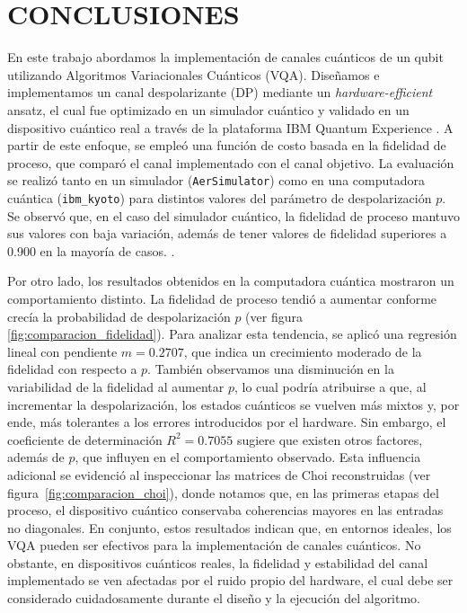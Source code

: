 \documentclass[letterpaper,12pt]{thesisECFM}
\theoremstyle{plain}
\theoremstyle{definition}
\theoremstyle{definition}
\theoremstyle{remark}
\newcommand{\1}{\mathbb{1}}
\begin{document}
\chapter{CONCLUSIONES} %
En este trabajo abordamos la implementación de canales cuánticos de un qubit utilizando Algoritmos Variacionales Cuánticos (VQA). Diseñamos e implementamos un canal despolarizante (DP) mediante un \textit{hardware-efficient} ansatz, el cual fue optimizado en un simulador cuántico y validado en un dispositivo cuántico real a través de la plataforma IBM Quantum Experience \cite{VQA,ibm_quantum_resources}. A partir de este enfoque, se empleó una función de costo basada en la fidelidad de proceso, que comparó el canal implementado con el canal objetivo. La evaluación se realizó tanto en un simulador (\texttt{AerSimulator}) como en una computadora cuántica (\texttt{ibm\_kyoto}) para distintos valores del parámetro de despolarización $p$. Se observó que, en el caso del simulador cuántico, la fidelidad de proceso mantuvo sus valores con baja variación, además de tener valores de fidelidad superiores a 0.900 en la mayoría de casos.   . 

Por otro lado, los resultados obtenidos en la computadora cuántica mostraron un comportamiento distinto. La fidelidad de proceso tendió a aumentar conforme crecía la probabilidad de despolarización $p$ (ver figura \ref{fig:comparacion_fidelidad}). Para analizar esta tendencia, se aplicó una regresión lineal con pendiente $m = 0.2707$, que indica un crecimiento moderado de la fidelidad con respecto a $p$. También observamos una disminución en la variabilidad de la fidelidad al aumentar $p$, lo cual podría atribuirse a que, al incrementar la despolarización, los estados cuánticos se vuelven más mixtos y, por ende, más tolerantes a los errores introducidos por el hardware. Sin embargo, el coeficiente de determinación $R^2 = 0.7055$ sugiere que existen otros factores, además de $p$, que influyen en el comportamiento observado. Esta influencia adicional se evidenció al inspeccionar las matrices de Choi reconstruidas (ver figura~\ref{fig:comparacion_choi}), donde notamos que, en las primeras etapas del proceso, el dispositivo cuántico conservaba coherencias mayores en las entradas no diagonales. En conjunto, estos resultados indican que, en entornos ideales, los VQA pueden ser efectivos para la implementación de canales cuánticos. No obstante, en dispositivos cuánticos reales, la fidelidad y estabilidad del canal implementado se ven afectadas por el ruido propio del hardware, el cual debe ser considerado cuidadosamente durante el diseño y la ejecución del algoritmo.
\end{document}
